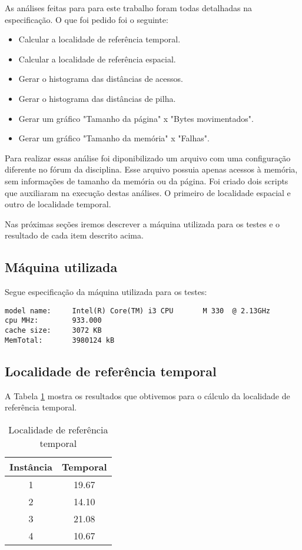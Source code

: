 \documentclass[12pt]{article}
\begin{document}
As análises feitas para para este trabalho foram todas detalhadas na especificação. O que foi pedido foi o seguinte:

\begin{itemize}
\item Calcular a localidade de referência temporal.
\item Calcular a localidade de referência espacial.
\item Gerar o histograma das distâncias de acessos.
\item Gerar o histograma das distâncias de pilha.
\item Gerar um gráfico "Tamanho da página" x "Bytes movimentados".
\item Gerar um gráfico "Tamanho da memória" x "Falhas".
\end{itemize}

Para realizar essas análise foi diponibilizado um arquivo com uma configuração diferente no fórum da disciplina. Esse arquivo possuia apenas acessos à memória, sem informações de tamanho da memória ou da página. Foi criado dois scripts que auxiliaram na execução destas análises. O primeiro de localidade espacial e outro de localidade temporal.

Nas próximas seções iremos descrever a máquina utilizada para os testes e o resultado de cada item descrito acima.

\subsection{Máquina utilizada}
\label{maquina}

Segue especificação da máquina utilizada para os testes:
\begin{verbatim}
model name:     Intel(R) Core(TM) i3 CPU       M 330  @ 2.13GHz
cpu MHz:        933.000
cache size:     3072 KB
MemTotal:       3980124 kB
\end{verbatim}


\subsection{Localidade de referência temporal}
\label{loc_ref_temp}

A Tabela \ref{tab_ref_temp} mostra os resultados que obtivemos para o cálculo da localidade de referência temporal.

\begin{table}[h!]
\centering
\begin{footnotesize}
\begin{tabular}{|c|c|}
\hline
\textbf{Instância}  & \textbf{Temporal}  \\ \hline
1 & 19.67 \\ \hline
2 & 14.10 \\ \hline
3 & 21.08 \\ \hline
4 & 10.67 \\ \hline

\end{tabular}
\end{footnotesize}
\caption{Localidade de referência temporal \label{tab_ref_temp}}
\end{table}
\end{document}
